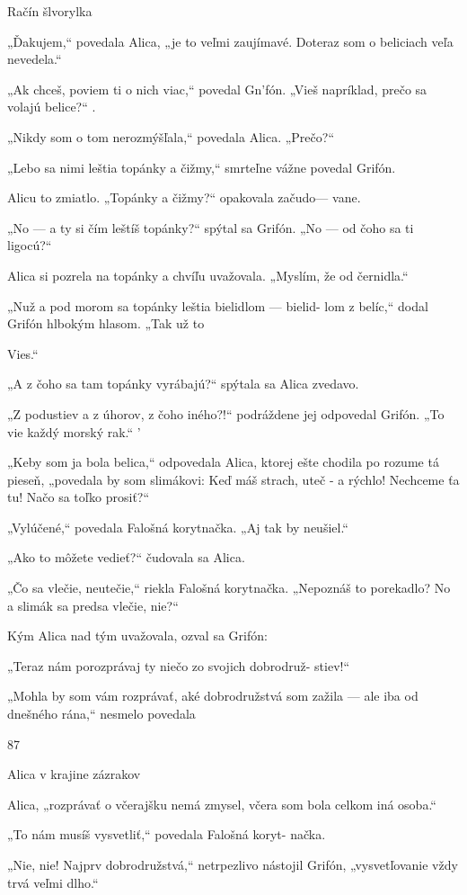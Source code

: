 \documentclass[12pt]{book}
\begin{document}
\begin{Parallel}[p]{}{}
{Račín šlvorylka

„Ďakujem,“ povedala Alica, „je to veľmi zaujímavé.
Doteraz som o beliciach veľa nevedela.“

„Ak chceš, poviem ti o nich viac,“ povedal Gn'fón. „Vieš
napríklad, prečo sa volajú belice?“ .

„Nikdy som o tom nerozmýšľala,“ povedala Alica.
„Prečo?“

„Lebo sa nimi leštia topánky a čižmy,“ smrteľne vážne
povedal Grifón.

Alicu to zmiatlo. „Topánky a čižmy?“ opakovala začudo—
vane.

„No — a ty si čím leštíš topánky?“ spýtal sa Grifón. „No
— od čoho sa ti ligocú?“

Alica si pozrela na topánky a chvíľu uvažovala. „Myslím,
že od černidla.“

„Nuž a pod morom sa topánky leštia bielidlom — bielid-
lom z belíc,“ dodal Grifón hlbokým hlasom. „Tak už to

Vies.“

„A z čoho sa tam topánky vyrábajú?“ spýtala sa Alica
zvedavo.

„Z podustiev a z úhorov, z čoho iného?!“ podráždene
jej odpovedal Grifón. „To vie každý morský rak.“ '

„Keby som ja bola belica,“ odpovedala Alica, ktorej ešte
chodila po rozume tá pieseň, „povedala by som slimákovi:
Keď máš strach, uteč - a rýchlo! Nechceme ťa tu! Načo sa
toľko prosiť?“

„Vylúčené,“ povedala Falošná korytnačka. „Aj tak by
neušiel.“

„Ako to môžete vedieť?“ čudovala sa Alica.

„Čo sa vlečie, neutečie,“ riekla Falošná korytnačka.
„Nepoznáš to porekadlo? No a slimák sa predsa vlečie,
nie?“

Kým Alica nad tým uvažovala, ozval sa Grifón:

„Teraz nám porozprávaj ty niečo zo svojich dobrodruž-
stiev!“

„Mohla by som vám rozprávať, aké dobrodružstvá som
zažila — ale iba od dnešného rána,“ nesmelo povedala

87

Alica v krajine zázrakov

Alica, „rozprávať o včerajšku nemá zmysel, včera som bola
celkom iná osoba.“

„To nám musíš vysvetliť,“ povedala Falošná koryt-
načka.

„Nie, nie! Najprv dobrodružstvá,“ netrpezlivo nástojil
Grifón, „vysvetľovanie vždy trvá veľmi dlho.“

}
\end{Parallel}
\end{document}
